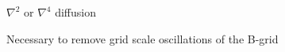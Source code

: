 \begin{slide}

\begin{list1}
\item $\nabla^2$ or $\nabla^4$ diffusion
\begin{list2}
    \item Necessary to remove grid scale oscillations of the B-grid
\end{list2}

\end{list1}

\end{slide}

